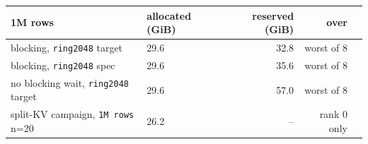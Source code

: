 \begin{tabular}{llrrl}
\toprule
1M rows & allocated (GiB) & reserved (GiB) & over \\
\midrule
blocking, \texttt{ring2048} target & 29.6 & 32.8 & worst of 8 \\
blocking, \texttt{ring2048} spec & 29.6 & 35.6 & worst of 8 \\
no blocking wait, \texttt{ring2048} target & 29.6 & 57.0 & worst of 8 \\
split-KV campaign, \texttt{1M rows} n=20 & 26.2 & -- & rank 0 only \\
\bottomrule
\end{tabular}
